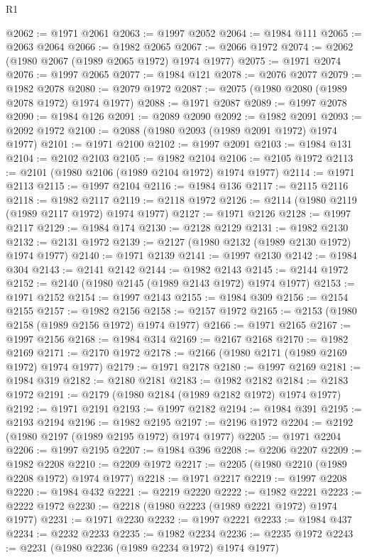 \begin{lexlean}{R1}
\begin{coremodule}
@2062 := @1971 @2061
@2063 := @1997 @2052
@2064 := @1984 @111
@2065 := @2063 @2064
@2066 := @1982 @2065
@2067 := @2066 @1972
@2074 := @2062 (@1980 @2067 (@1989 @2065 @1972) @1974 @1977)
@2075 := @1971 @2074
@2076 := @1997 @2065
@2077 := @1984 @121
@2078 := @2076 @2077
@2079 := @1982 @2078
@2080 := @2079 @1972
@2087 := @2075 (@1980 @2080 (@1989 @2078 @1972) @1974 @1977)
@2088 := @1971 @2087
@2089 := @1997 @2078
@2090 := @1984 @126
@2091 := @2089 @2090
@2092 := @1982 @2091
@2093 := @2092 @1972
@2100 := @2088 (@1980 @2093 (@1989 @2091 @1972) @1974 @1977)
@2101 := @1971 @2100
@2102 := @1997 @2091
@2103 := @1984 @131
@2104 := @2102 @2103
@2105 := @1982 @2104
@2106 := @2105 @1972
@2113 := @2101 (@1980 @2106 (@1989 @2104 @1972) @1974 @1977)
@2114 := @1971 @2113
@2115 := @1997 @2104
@2116 := @1984 @136
@2117 := @2115 @2116
@2118 := @1982 @2117
@2119 := @2118 @1972
@2126 := @2114 (@1980 @2119 (@1989 @2117 @1972) @1974 @1977)
@2127 := @1971 @2126
@2128 := @1997 @2117
@2129 := @1984 @174
@2130 := @2128 @2129
@2131 := @1982 @2130
@2132 := @2131 @1972
@2139 := @2127 (@1980 @2132 (@1989 @2130 @1972) @1974 @1977)
@2140 := @1971 @2139
@2141 := @1997 @2130
@2142 := @1984 @304
@2143 := @2141 @2142
@2144 := @1982 @2143
@2145 := @2144 @1972
@2152 := @2140 (@1980 @2145 (@1989 @2143 @1972) @1974 @1977)
@2153 := @1971 @2152
@2154 := @1997 @2143
@2155 := @1984 @309
@2156 := @2154 @2155
@2157 := @1982 @2156
@2158 := @2157 @1972
@2165 := @2153 (@1980 @2158 (@1989 @2156 @1972) @1974 @1977)
@2166 := @1971 @2165
@2167 := @1997 @2156
@2168 := @1984 @314
@2169 := @2167 @2168
@2170 := @1982 @2169
@2171 := @2170 @1972
@2178 := @2166 (@1980 @2171 (@1989 @2169 @1972) @1974 @1977)
@2179 := @1971 @2178
@2180 := @1997 @2169
@2181 := @1984 @319
@2182 := @2180 @2181
@2183 := @1982 @2182
@2184 := @2183 @1972
@2191 := @2179 (@1980 @2184 (@1989 @2182 @1972) @1974 @1977)
@2192 := @1971 @2191
@2193 := @1997 @2182
@2194 := @1984 @391
@2195 := @2193 @2194
@2196 := @1982 @2195
@2197 := @2196 @1972
@2204 := @2192 (@1980 @2197 (@1989 @2195 @1972) @1974 @1977)
@2205 := @1971 @2204
@2206 := @1997 @2195
@2207 := @1984 @396
@2208 := @2206 @2207
@2209 := @1982 @2208
@2210 := @2209 @1972
@2217 := @2205 (@1980 @2210 (@1989 @2208 @1972) @1974 @1977)
@2218 := @1971 @2217
@2219 := @1997 @2208
@2220 := @1984 @432
@2221 := @2219 @2220
@2222 := @1982 @2221
@2223 := @2222 @1972
@2230 := @2218 (@1980 @2223 (@1989 @2221 @1972) @1974 @1977)
@2231 := @1971 @2230
@2232 := @1997 @2221
@2233 := @1984 @437
@2234 := @2232 @2233
@2235 := @1982 @2234
@2236 := @2235 @1972
@2243 := @2231 (@1980 @2236 (@1989 @2234 @1972) @1974 @1977)

\end{coremodule}
\end{lexlean}
